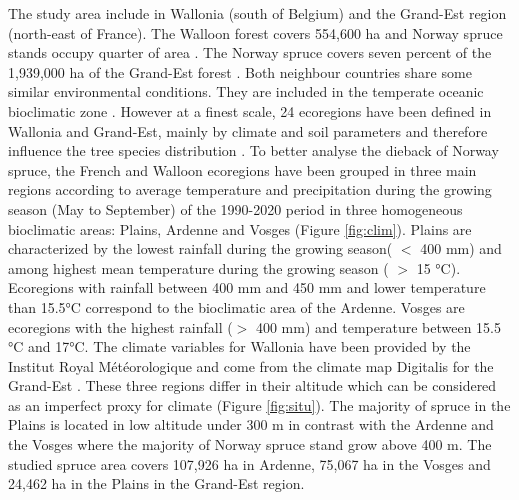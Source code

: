 \documentclass[3p,procedia]{elsarticle}
\begin{document}
The study area include in Wallonia (south of Belgium) and the Grand-Est region (north-east of France).
The Walloon forest covers 554,600 ha and  Norway spruce stands occupy quarter of area \citep{lejeune_ep_2022}.  
The Norway spruce covers seven percent of the 1,939,000 ha of the Grand-Est forest \citep{IGN2022}. 
Both neighbour countries share some similar environmental conditions.
They are included in the temperate oceanic bioclimatic zone \citep{lindner_climate_2010}.
However at a finest scale, 24 ecoregions have been defined in  Wallonia and Grand-Est, mainly by climate and soil parameters and therefore influence the tree species distribution \citep{walthert_tree_2017}.
To better analyse the dieback of Norway spruce, the French and Walloon ecoregions have been grouped in three main regions according to average temperature and precipitation during the growing season (May to September) of the 1990-2020 period in three homogeneous bioclimatic areas: Plains, Ardenne and Vosges (Figure \ref{fig:clim}).
Plains are characterized by the lowest rainfall during the growing season( $<$ 400 mm) and among highest mean temperature during the growing season ( $>$ 15 °C).
Ecoregions with rainfall between 400 mm and 450 mm and lower temperature than 15.5°C correspond to the bioclimatic area of the Ardenne.
Vosges are ecoregions with the highest rainfall ($>$ 400 mm) and temperature between 15.5 °C and 17°C.
The climate variables for Wallonia have been provided by the Institut Royal Météorologique and come from the climate map Digitalis for the Grand-Est \citep{piedallu_presentation_2014}.
These three regions differ in their altitude which can be considered as an imperfect proxy for climate (Figure \ref{fig:situ}). 
The majority of spruce in the Plains is located in low altitude under 300 m in contrast with the Ardenne and the Vosges where the majority of Norway spruce stand grow above 400 m. 
The studied spruce area covers 107,926 ha in Ardenne, 75,067 ha in the Vosges and  24,462 ha in the Plains in the Grand-Est region.
\end{document}

